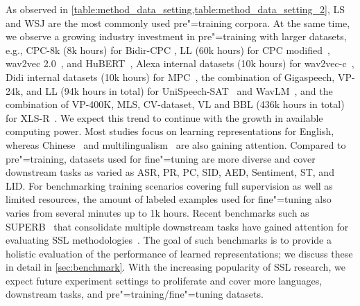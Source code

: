 As observed in \cref{table:method_data_setting,table:method_data_setting_2}, LS and WSJ are the most commonly used
pre"=training corpora. At the same time, we observe a
growing industry investment in pre"=training with larger datasets, e.g.,
CPC-8k (8k hours) for Bidir-CPC \parencite{kawakami_learning_2020}, LL (60k hours) for
CPC modified~\parencite{riviere_unsupervised_2020}, 
wav2vec 2.0~\parencite{baevski_wav2vec_2020}, and HuBERT~\parencite{hsu_hubert_2021}, Alexa internal
datasets (10k hours) for wav2vec-c~\parencite{sadhu_wav2vecc_2021}, Didi internal
datasets (10k hours) for MPC~\parencite{jiang_improving_2019, jiang_further_2021}, the
combination of Gigaspeech, VP-24k, and LL (94k hours in total) for
UniSpeech-SAT~\parencite{chen_unispeechsat_2021} and WavLM~\parencite{chen_wavlm_2021}, and
the combination of VP-400K, MLS, CV-dataset, VL and BBL (436k hours in total)
for XLS-R~\parencite{babu_xlsr_2021}. We expect this trend to continue with the growth
in available computing power. Most studies focus on learning representations
for English, whereas Chinese~\parencite{jiang_improving_2019, jiang_further_2021} and
multilingualism~\parencite{kawakami_learning_2020, babu_xlsr_2021} are also gaining
attention. Compared to pre"=training, datasets used for fine"=tuning are more
diverse and cover downstream tasks as varied as ASR, PR, PC, SID, AED,
Sentiment, ST, and LID. For benchmarking training scenarios covering full
supervision as well as limited resources, the amount of labeled examples used for
fine"=tuning also varies from several minutes up to 1k hours. Recent
benchmarks such as SUPERB~\parencite{yang_superb_2021} that consolidate multiple 
downstream tasks have gained attention for evaluating SSL
methodologies~\parencite{chen_unispeechsat_2021, chen_wavlm_2021}. The goal of such benchmarks is
to provide a holistic evaluation of the performance of learned representations; 
we discuss these in detail in \cref{sec:benchmark}. With the increasing
popularity of SSL research, we expect future experiment settings to proliferate
and cover more languages, downstream tasks, and pre"=training/fine"=tuning
datasets.

